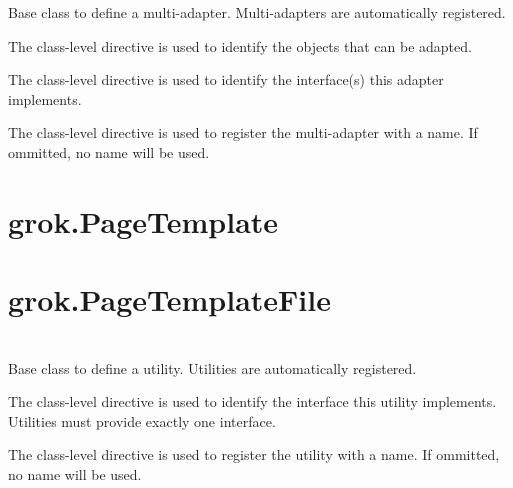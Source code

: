     Base class to define a multi-adapter. Multi-adapters are automatically
    registered.

    The class-level directive  is used to identify
    the objects that can be adapted.

    The class-level directive  is used to identify
    the interface(s) this adapter implements.

    The class-level directive  is used to register the
    multi-adapter with a name. If ommitted, no name will be used.

\section{grok.PageTemplate}

\section{grok.PageTemplateFile}

\section{}

\section{}

\section{}

    Base class to define a utility. Utilities are automatically registered.

    The class-level directive  is used to identify
    the interface this utility implements. Utilities must provide exactly one
    interface.

    The class-level directive  is used to register the
    utility with a name. If ommitted, no name will be used.

\section{}

\section{}

